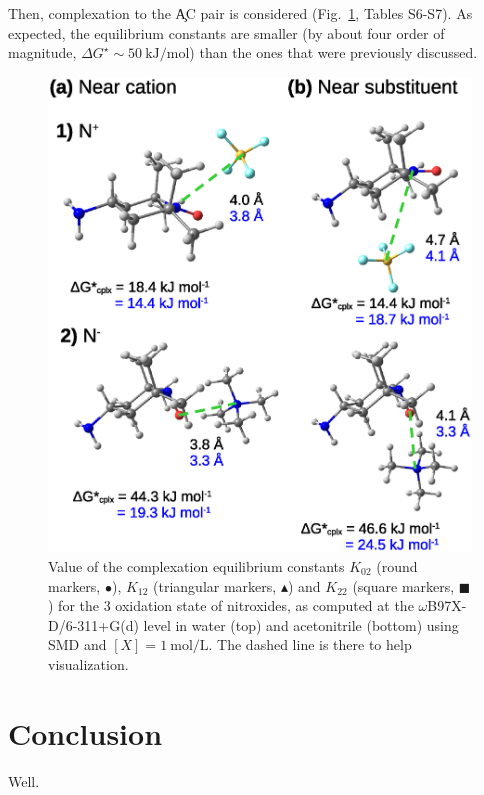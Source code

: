 \documentclass[review]{elsarticle}
\begin{document}
Then, complexation to the \c{AC} pair is considered (Fig.~\ref{fig:Kx2}, Tables S6-S7). As expected, the equilibrium constants are smaller (by about four order of magnitude, $\Delta G^\star \sim \SI{50}{\kilo\joule\per\mole}$) than the ones that were previously discussed.


\begin{figure}[!h]
\centering
\includegraphics[width=\linewidth]{Figure13}
\caption{Value of the complexation equilibrium constants $K_{02}$ (round markers, $\bullet$), $K_{12}$ (triangular markers, $\blacktriangle$) and $K_{22}$ (square markers, $\blacksquare$) for the 3 oxidation state of nitroxides, as computed at the $\omega$B97X-D/6-311+G(d) level in water (top) and acetonitrile (bottom) using SMD and $[X]=\SI{1}{\mole\per\liter}$.  The dashed line is there to help visualization. }
\label{fig:Kx2}
\end{figure}

\clearpage
\section{Conclusion}

Well.
	
	
 

	
\end{document}
